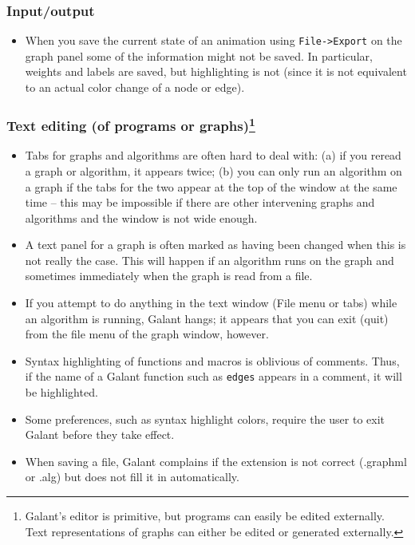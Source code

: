 
\subsubsection*{Input/output}

\begin{itemize}

\item
When you save the current state of an animation using \texttt{File->Export}
on the graph panel some of the information might not be saved.
In particular, weights and labels are saved, but highlighting is not (since it is not equivalent to an actual color change of a node or edge).

\end{itemize}

\subsubsection*{Text editing (of programs or graphs)\footnote{
Galant's editor  is primitive, but
programs can easily be edited externally.
Text representations of graphs can either be edited or generated externally.}}

\begin{itemize}

\item Tabs for graphs and algorithms are often hard to deal with: (a) if you
  reread a graph or algorithm, it appears twice; (b) you can only run an
  algorithm on a graph if the tabs for the two appear at the top of the
  window at the same time -- this
  may be impossible if there are other intervening graphs and algorithms
  and the window is not wide enough.

\item A text panel for a graph is often marked as having been changed when
  this is not really the case. This will happen if an algorithm runs on the
  graph and sometimes immediately when the graph is read from a file.

\item If you attempt to do anything in the text window (File menu or tabs)
  while an algorithm is running, Galant hangs;
  it appears that you can exit (quit) from
  the file menu of the graph window, however.

\item
  Syntax highlighting of functions and macros is oblivious of comments.
  Thus, if the name of a Galant function
  such as \texttt{edges} appears in a comment,
  it will be highlighted.

\item
  Some preferences, such as syntax highlight colors, require the user to exit Galant before
  they take effect.

\item
  When saving a file, Galant complains if the extension is not correct (\textsf{.graphml}
  or \textsf{.alg}) but does not fill it in automatically.

\end{itemize}

